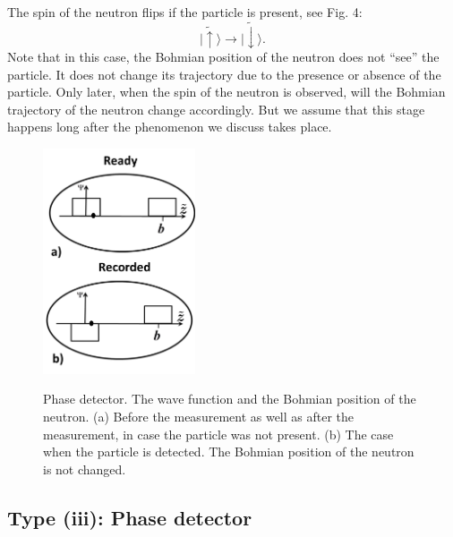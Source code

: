 \documentclass[preprint,tightenlines]{elsarticle}
\begin{document}
 The spin of the neutron flips if the particle
is present, see Fig. 4:
 \begin{equation}
|\tilde{\uparrow}\rangle\rightarrow|\tilde{\downarrow}\rangle.\label{spindet}
\end{equation}
 Note that in this case, the Bohmian position of the neutron does not ``see''
the particle. It does not change its trajectory due to the presence
or absence of the particle. Only later, when the spin of the neutron
is observed, will the Bohmian trajectory of the neutron change
accordingly. But we assume that this stage happens long after the
phenomenon we discuss takes place.


\begin{figure}[h]
  \includegraphics[width=4.5cm]{5.pdf}\\  \vspace{-6pt}
    \caption{ Phase detector.   The wave function and the Bohmian position of the neutron. (a)  Before the measurement as well as after the measurement, in case the particle was not present. (b) The case when the particle is detected.  The Bohmian position of the neutron is not changed.}
\end{figure}

\subsection{ Type {\rm (iii)}: Phase detector}
\end{document}
